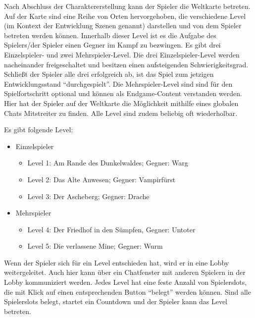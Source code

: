 Nach Abschluss der Charaktererstellung kann der Spieler die Weltkarte betreten. Auf der Karte sind eine Reihe von Orten hervorgehoben, die verschiedene Level (im Kontext der Entwicklung Szenen genannt) darstellen und von dem Spieler betreten werden können. Innerhalb dieser Level ist es die Aufgabe des Spielers/der Spieler einen Gegner im Kampf zu bezwingen. Es gibt drei Einzelspieler- und zwei Mehrspieler-Level. Die drei Einzelspieler-Level werden nacheinander freigeschaltet und besitzen einen aufsteigenden Schwierigkeitsgrad. Schließt der Spieler alle drei erfolgreich ab, ist das Spiel zum jetzigen Entwicklungsstand \enquote{durchgespielt}. Die Mehrspieler-Level sind sind für den Spielfortschritt optional und können als Endgame-Content verstanden werden. Hier hat der Spieler auf der Weltkarte die Möglichkeit mithilfe eines globalen Chats Mitstreiter zu finden. Alle Level sind zudem beliebig oft wiederholbar.

Es gibt folgende Level:
\begin{itemize}
    \item Einzelspieler
    \begin{itemize}
        \item Level 1:  Am Rande des Dunkelwaldes; Gegner: Warg
        \item Level 2:  Das Alte Anwesen; Gegner: Vampirfürst
        \item Level 3:  Der Ascheberg; Gegner: Drache
    \end{itemize}
    \item Mehrspieler
    \begin{itemize}
        \item Level 4:  Der Friedhof in den Sümpfen, Gegner: Untoter
        \item Level 5:  Die verlassene Mine; Gegner: Wurm
    \end{itemize}
\end{itemize}

Wenn der Spieler sich für ein Level entschieden hat, wird er in eine Lobby weitergeleitet. Auch hier kann über ein Chatfenster mit anderen Spielern in der Lobby kommuniziert werden. Jedes Level hat eine feste Anzahl von Spielerslots, die mit Klick auf einen entsprechenden Button \enquote{belegt} werden können. Sind alle Spielerslots belegt, startet ein Countdown und der Spieler kann das Level betreten. 

